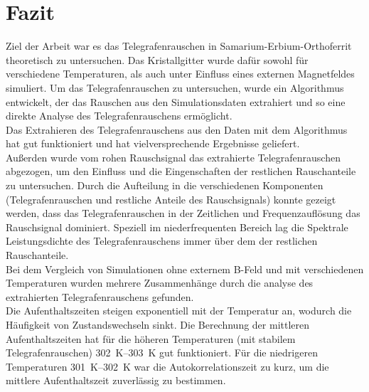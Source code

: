 \documentclass[main.tex]{subfiles}
\begin{document}
\newpage
\section{Fazit}

Ziel der Arbeit war es das Telegrafenrauschen in Samarium-Erbium-Orthoferrit theoretisch zu untersuchen. Das Kristallgitter wurde dafür sowohl für verschiedene Temperaturen, als auch unter Einfluss eines externen Magnetfeldes simuliert. 
Um das Telegrafenrauschen zu untersuchen, wurde ein Algorithmus entwickelt, der das Rauschen aus den Simulationsdaten extrahiert und so eine direkte Analyse des Telegrafenrauschens ermöglicht.\\

Das Extrahieren des Telegrafenrauschens aus den Daten mit dem Algorithmus hat gut funktioniert und hat vielversprechende Ergebnisse geliefert.\\
Außerden wurde vom rohen Rauschsignal das extrahierte Telegrafenrauschen abgezogen, um den Einfluss und die Eingenschaften der restlichen Rauschanteile zu untersuchen.
Durch die Aufteilung in die verschiedenen Komponenten (Telegrafenrauschen und restliche Anteile des Rauschsignals) konnte gezeigt werden, dass das Telegrafenrauschen in der Zeitlichen und Frequenzauflösung das Rauschsignal dominiert. Speziell im niederfrequenten Bereich lag die Spektrale Leistungsdichte des Telegrafenrauschens immer über dem der restlichen Rauschanteile.\\

Bei dem Vergleich von Simulationen ohne externem B-Feld und mit verschiedenen Temperaturen wurden mehrere Zusammenhänge durch die analyse des extrahierten Telegrafenrauschens gefunden.\\
Die Aufenthaltszeiten steigen exponentiell mit der Temperatur an, wodurch die Häufigkeit von Zustandswechseln sinkt. Die Berechnung der mittleren Aufenthaltszeiten hat für die höheren Temperaturen (mit stabilem Telegrafenrauschen) \SIrange{302}{303}{\kelvin} gut funktioniert. Für die niedrigeren Temperaturen \SIrange{301}{302}{\kelvin} war die Autokorrelationszeit zu kurz, um die mittlere Aufenthaltszeit zuverlässig zu bestimmen.\\
\end{document}
